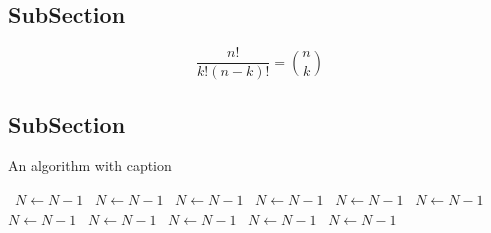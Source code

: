 \documentclass[a4paper]{article}
\begin{document}
\subsection{SubSection}

\[ \frac{n!}{k!(n-k)!} = \binom{n}{k} \]

\subsection{SubSection}

\begin{algorithm}
\caption{An algorithm with caption}
\begin{algorithmic}
\    \State $N \gets N - 1$
\    \State $N \gets N - 1$
\    \State $N \gets N - 1$
\    \State $N \gets N - 1$
\    \State $N \gets N - 1$
\    \State $N \gets N - 1$
\    \State $N \gets N - 1$
\    \State $N \gets N - 1$
\    \State $N \gets N - 1$
\    \State $N \gets N - 1$
\    \State $N \gets N - 1$
\EndWhile
\end{algorithmic}
\end{algorithm}
\end{document}
